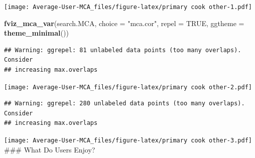 \documentclass[
]{article}
\newenvironment{Shaded}{\begin{snugshade}}{\end{snugshade}}
\newcommand{\DataTypeTok}[1]{\textcolor[rgb]{0.13,0.29,0.53}{#1}}
\newcommand{\KeywordTok}[1]{\textcolor[rgb]{0.13,0.29,0.53}{\textbf{#1}}}
\newcommand{\NormalTok}[1]{#1}
\newcommand{\OtherTok}[1]{\textcolor[rgb]{0.56,0.35,0.01}{#1}}
\newcommand{\StringTok}[1]{\textcolor[rgb]{0.31,0.60,0.02}{#1}}
\begin{document}
\texttt{[image: Average-User-MCA\_files/figure-latex/primary cook other-1.pdf]}

\begin{Shaded}
\begin{Highlighting}[]
\KeywordTok{fviz_mca_var}\NormalTok{(search.MCA, }\DataTypeTok{choice =} \StringTok{"mca.cor"}\NormalTok{, }\DataTypeTok{repel =} \OtherTok{TRUE}\NormalTok{,}
             \DataTypeTok{ggtheme =} \KeywordTok{theme_minimal}\NormalTok{())}
\end{Highlighting}
\end{Shaded}

\begin{verbatim}
## Warning: ggrepel: 81 unlabeled data points (too many overlaps). Consider
## increasing max.overlaps
\end{verbatim}

\texttt{[image: Average-User-MCA\_files/figure-latex/primary cook other-2.pdf]}

\begin{Shaded}
\end{Shaded}

\begin{verbatim}
## Warning: ggrepel: 280 unlabeled data points (too many overlaps). Consider
## increasing max.overlaps
\end{verbatim}

\texttt{[image: Average-User-MCA\_files/figure-latex/primary cook other-3.pdf]}
\#\#\# What Do Users Enjoy?
\end{document}
